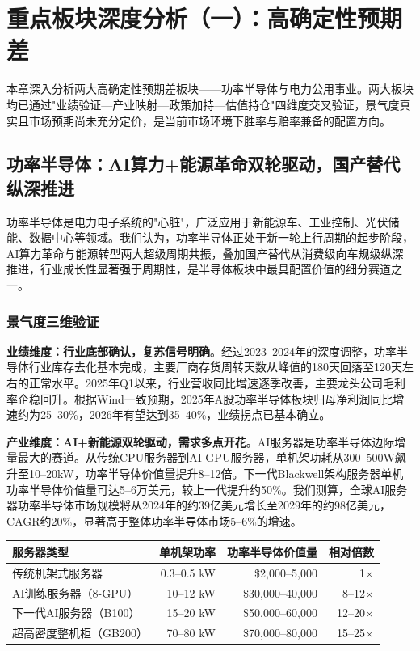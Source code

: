 
\chapter{重点板块深度分析（一）：高确定性预期差}

本章深入分析两大高确定性预期差板块——功率半导体与电力公用事业。两大板块均已通过"业绩验证—产业映射—政策加持—估值持仓"四维度交叉验证，景气度真实且市场预期尚未充分定价，是当前市场环境下胜率与赔率兼备的配置方向。

\section{功率半导体：AI算力+能源革命双轮驱动，国产替代纵深推进}

功率半导体是电力电子系统的"心脏"，广泛应用于新能源车、工业控制、光伏储能、数据中心等领域。我们认为，功率半导体正处于新一轮上行周期的起步阶段，AI算力革命与能源转型两大超级周期共振，叠加国产替代从消费级向车规级纵深推进，行业成长性显著强于周期性，是半导体板块中最具配置价值的细分赛道之一。

\subsection{景气度三维验证}

\textbf{业绩维度：行业底部确认，复苏信号明确}。经过2023--2024年的深度调整，功率半导体行业库存去化基本完成，主要厂商存货周转天数从峰值的180天回落至120天左右的正常水平。2025年Q1以来，行业营收同比增速逐季改善，主要龙头公司毛利率企稳回升。根据Wind一致预期，2025年A股功率半导体板块归母净利润同比增速约为25--30\%，2026年有望达到35--40\%，业绩拐点已基本确立。

\vspace{0.3em}

\textbf{产业维度：AI+新能源双轮驱动，需求多点开花}。AI服务器是功率半导体边际增量最大的赛道。从传统CPU服务器到AI GPU服务器，单机架功耗从300--500W飙升至10--20kW，功率半导体价值量提升8--12倍。下一代Blackwell架构服务器单机功率半导体价值量可达5--6万美元，较上一代提升约50\%。我们测算，全球AI服务器功率半导体市场规模将从2024年的约39亿美元增长至2029年的约98亿美元，CAGR约20\%，显著高于整体功率半导体市场5--6\%的增速。

\begin{exhibitbox}[表4-1：服务器演进与功率半导体价值量对比]
\centering
\small
\begin{tabular}{l r r r}
\toprule
\textbf{服务器类型} & \textbf{单机架功率} & \textbf{功率半导体价值量} & \textbf{相对倍数} \\
\midrule
传统机架式服务器 & 0.3--0.5 kW & \$2,000--5,000 & 1$\times$ \\
AI训练服务器（8-GPU） & 10--12 kW & \$30,000--40,000 & 8--12$\times$ \\
下一代AI服务器（B100） & 15--20 kW & \$50,000--60,000 & 12--20$\times$ \\
超高密度整机柜（GB200） & 70--80 kW & \$70,000--80,000 & 15--25$\times$ \\
\bottomrule
\end{tabular}
\end{exhibitbox}

